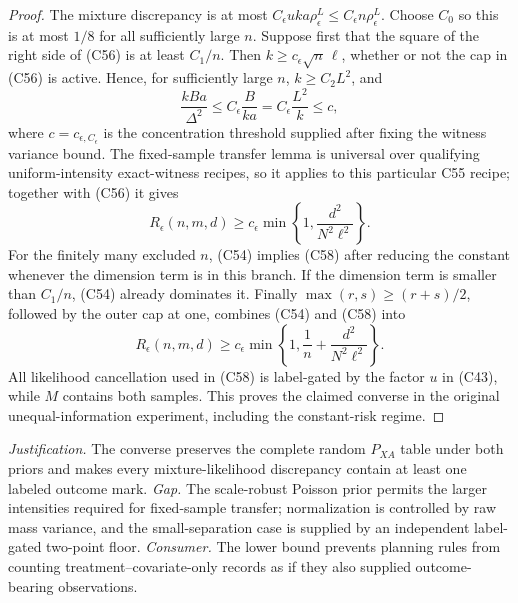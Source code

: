 \documentclass{article}
\begin{document}
\begin{proof}
The mixture discrepancy is at most \(C_\epsilon uka\rho_\epsilon^L\le C_\epsilon n\rho_\epsilon^L\).  Choose \(C_0\) so this is at most \(1/8\) for all sufficiently large \(n\).  Suppose first that the square of the right side of (C56) is at least \(C_1/n\).  Then \(k\ge c_\epsilon\sqrt n\,\ell\), whether or not the cap in (C56) is active.  Hence, for sufficiently large \(n\), \(k\ge C_2L^2\), and
\[
 \frac{kBa}{\Delta^2}\le C_\epsilon\frac{B}{ka}
 =C_\epsilon\frac{L^2}{k}\le c,                                  \tag{C57}
\]
where \(c=c_{\epsilon,C_\epsilon}\) is the concentration threshold supplied after fixing the witness variance bound.  The fixed-sample transfer lemma is universal over qualifying uniform-intensity exact-witness recipes, so it applies to this particular C55 recipe; together with (C56) it gives
\[
 R_\epsilon(n,m,d)\ge c_\epsilon
 \min\!\left\{1,\frac{d^2}{N^2\ell^2}\right\}.                   \tag{C58}
\]
For the finitely many excluded \(n\), (C54) implies (C58) after reducing the constant whenever the dimension term is in this branch.  If the dimension term is smaller than \(C_1/n\), (C54) already dominates it.  Finally \(\max(r,s)\ge(r+s)/2\), followed by the outer cap at one, combines (C54) and (C58) into
\[
 R_\epsilon(n,m,d)\ge c_\epsilon
 \min\!\left\{1,\frac1n+\frac{d^2}{N^2\ell^2}\right\}.            \tag{C59}
\]
All likelihood cancellation used in (C58) is label-gated by the factor \(u\) in (C43), while \(M\) contains both samples.  This proves the claimed converse in the original unequal-information experiment, including the constant-risk regime.
\end{proof}
\par\smallskip\noindent \textit{Justification.} The converse preserves the complete random \(P_{XA}\) table under both priors and makes every mixture-likelihood discrepancy contain at least one labeled outcome mark. \textit{Gap.} The scale-robust Poisson prior permits the larger intensities required for fixed-sample transfer; normalization is controlled by raw mass variance, and the small-separation case is supplied by an independent label-gated two-point floor. \textit{Consumer.} The lower bound prevents planning rules from counting treatment--covariate-only records as if they also supplied outcome-bearing observations.
\end{document}
